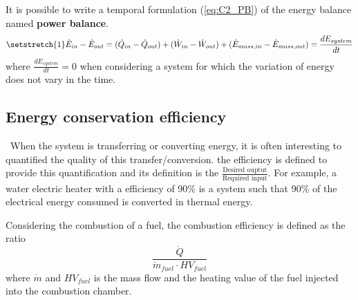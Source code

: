It is possible to write a temporal formulation (\ref{eq:C2_PB}) of the energy balance named \textbf{power balance}.  
\begin{equation}
\setstretch{1}
    \dot{E}_{in} - \dot{E}_{out} = (\dot{Q}_{in} - \dot{Q}_{out}) + (\dot{W}_{in} - \dot{W}_{out}) + (\dot{E}_{mass,in} - \dot{E}_{mass,out}) = \frac{dE_{system}}{dt} \label{eq:C2_PB}
\end{equation}
where $\frac{dE_{system}}{dt}=0$ when considering a system for which the variation of energy does not vary in the time.

\subsection{Energy conservation efficiency}
\quad\, When the system is transferring or converting energy, it is often interesting to quantified the quality of this transfer/conversion. the efficiency is defined to provide this quantification and its definition is the
$\frac{\text{Desired ouptut}}{\text{Required input}}$. For example, a water electric heater with a efficiency of 90\% is a system such that 90\% of the electrical energy consumed is converted in thermal energy.  

Considering the combustion of a fuel, the combustion efficiency is defined as the ratio
$$ \frac{\dot{Q}}{\dot{m}_{fuel}\cdot HV_{fuel}}$$
where $\dot{m}$  and $HV_{fuel}$ is the mass flow and the heating value of the fuel injected into the combustion chamber.